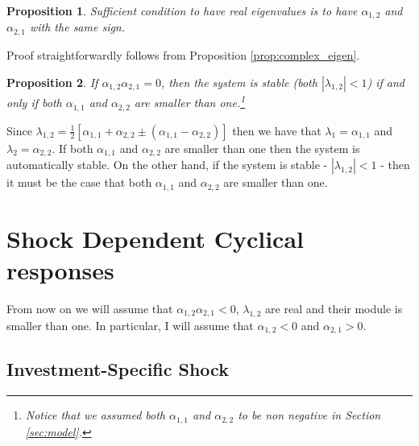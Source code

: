 \documentclass{article}
\newtheorem{prop}{Proposition}
\newenvironment{proof}[1][Proof]{\begin{trivlist}
\item[\hskip \labelsep {\bfseries #1}]}{\end{trivlist}}
\begin{document}
\begin{prop}\label{prop:real_eigen}
Sufficient condition to have real eigenvalues is to have $\alpha_{1,2}$ and $\alpha_{2,1}$ with the same sign.
\end{prop}

\begin{proof}
	Proof straightforwardly follows from Proposition \ref{prop:complex_eigen}.
\end{proof}

\begin{prop}\label{prop:stability_one}
	If $\alpha_{1,2}\alpha_{2,1} = 0$, then the system is stable (both $|\lambda_{1,2}| < 1$) if and only if both $\alpha_{1,1}$ and $\alpha_{2,2}$ are smaller than one.\footnote{Notice that we assumed both $\alpha_{1,1}$ and $\alpha_{2,2}$ to be non negative in Section \ref{sec:model}.}
\end{prop}

\begin{proof}
Since $\lambda_{1,2} = \frac{1}{2} [ \alpha_{1,1} + \alpha_{2,2}  \pm ( \alpha_{1,1} - \alpha_{2,2} ) ]$ then we have that $\lambda_1 = \alpha_{1,1}$ and $\lambda_2 = \alpha_{2,2}$. If both $\alpha_{1,1}$ and $\alpha_{2,2}$ are smaller than one then the system is automatically stable. On the other hand, if the system is stable - $|\lambda_{1,2}| < 1$ - then it must be the case that both $\alpha_{1,1}$ and $\alpha_{2,2}$ are smaller than one.
\end{proof}

\section{Shock Dependent Cyclical responses}

From now on we will assume that $\alpha_{1,2} \alpha_{2,1} < 0$, $\lambda_{1,2}$ are real and their module is smaller than one. In particular, I will assume that $\alpha_{1,2} < 0$ and $\alpha_{2,1} > 0$.

\subsection{Investment-Specific Shock}
\end{document}
